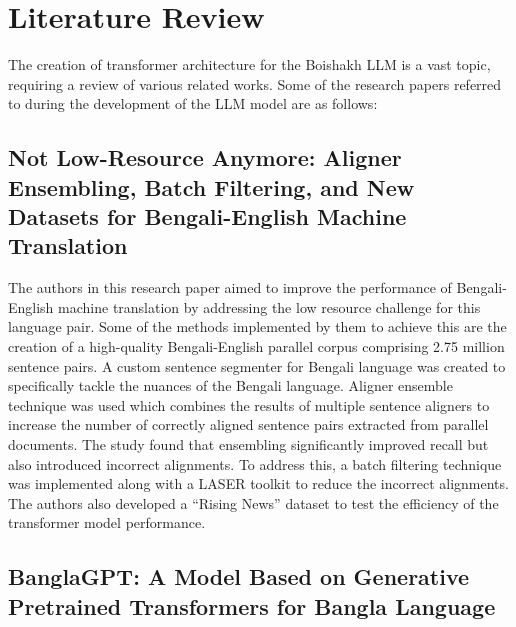 \section{Literature Review}

The creation of transformer architecture for the Boishakh LLM is a vast topic, requiring a review of various related works. Some of the research papers referred to during the development of the LLM model are as follows:

\subsection{Not Low-Resource Anymore: Aligner Ensembling, Batch Filtering, and New Datasets for Bengali-English Machine Translation}

\cite{BengaliMT:1}The authors in this research paper aimed to improve the performance of Bengali-English machine translation by addressing the low resource challenge for this language pair. Some of the methods implemented by them to achieve this are the creation of a high-quality Bengali-English parallel corpus comprising 2.75 million sentence pairs. A custom sentence segmenter for Bengali language was created to specifically tackle the nuances of the Bengali language. Aligner ensemble technique was used which combines the results of multiple sentence aligners to increase the number of correctly aligned sentence pairs extracted from parallel documents. The study found that ensembling significantly improved recall but also introduced incorrect alignments. To address this, a batch filtering technique was implemented along with a LASER toolkit to reduce the incorrect alignments.\\
The authors also developed a “Rising News” dataset to test the efficiency of the transformer model performance.

\subsection{BanglaGPT: A Model Based on Generative Pretrained Transformers for Bangla Language}


